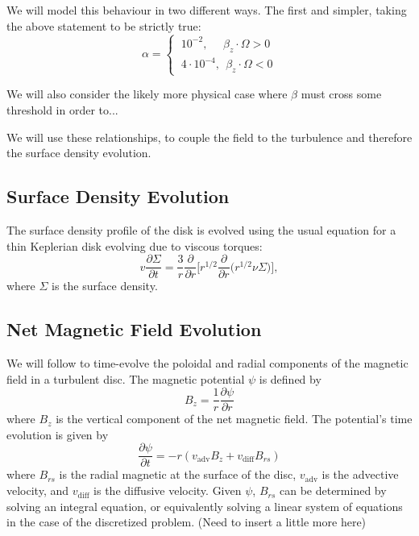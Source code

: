 We will model this behaviour in two different ways.  The first and simpler, taking the above statement to be strictly true:
$$
\alpha=
\begin{cases}
~10^{-2}, \ \ \ \ \ \ \beta_z \cdot \Omega > 0  \\
~4 \cdot 10^{-4}, \ \ \beta_z \cdot \Omega < 0
\end{cases}
$$

We will also consider the likely more physical case where $\beta$ must cross some threshold in order to...

We will use these relationships, to couple the field to the turbulence and therefore the surface density evolution.   


\subsection{Surface Density Evolution} 
\label{sdEvo}
The surface density profile of the disk is evolved using the usual equation for a thin Keplerian disk evolving due to viscous torques:
\begin{equation}
v\frac{\partial \Sigma}{\partial t} = 
\frac{3}{r} \frac{\partial}{\partial r} \bigg[
	r^{1/2} \frac{\partial}{\partial r} \Big( 
		r^{1/2} \nu \Sigma
	\Big)
\bigg],
\end{equation}
where $\Sigma$ is the surface density.  


\subsection{Net Magnetic Field Evolution} 
\label{bEvo}
We will follow \cite{lubow93} to time-evolve the poloidal and radial components of the magnetic field in a turbulent disc.  The magnetic potential $\psi$ is defined by 
\begin{equation}
B_z = \frac{1}{r} \frac{\partial \psi}{\partial r} 
\end{equation}
\noindent where $B_z$ is the vertical component of the net magnetic field.  The potential's time evolution is given by  
\begin{equation}
\frac{\partial \psi }{\partial t} = -r(v_{\text{adv}}B_z + v_{\text{diff}} B_{rs}) 
\end{equation}
where $B_{rs}$ is the radial magnetic at the surface of the disc, $v_{\text{adv}}$ is the advective velocity, and $v_{\text{diff}}$ is the diffusive velocity.  Given $\psi$, $B_{rs}$ can be determined by solving an integral equation, or equivalently solving a linear system of equations in the case of the discretized problem.  (Need to insert a little more here) 

